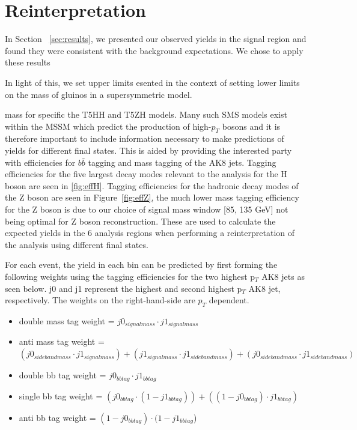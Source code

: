 \chapter{Reinterpretation}
\label{chap:reinterpretation}

In Section ~\ref{sec:results}, we presented our observed yields in the signal region and found they were consistent with the background expectations. We chose to apply these results


In light of this, we set upper limits esented in the context of setting lower limits on the mass of gluinos in a supersymmetric model. 

mass for specific the T5HH and T5ZH models. Many such SMS models exist within the MSSM which predict the production of high-$p_{T}$ bosons and it is therefore important to include information necessary to make predictions of yields for different final states. This is aided by providing the interested party with efficiencies for $b\bar{b}$ tagging and mass tagging of the AK8 jets. Tagging efficiencies for the five largest decay modes relevant to the analysis for the H boson are seen in \ref{fig:effH}. Tagging efficiencies for the hadronic decay modes of the Z boson are seen in Figure~\ref{fig:effZ}, the much lower mass tagging efficiency for the Z boson is due to our choice of signal mass window [85, 135 GeV] not being optimal for Z boson reconstruction. These are used to calculate the expected yields in the 6 analysis regions when performing a reinterpretation of the analysis using different final states. 

For each event, the yield in each bin can be predicted by first forming the following weights using the tagging efficiencies for the two highest p$_{T}$ AK8 jets as seen below. j0 and j1 represent the highest and second highest p$_{T}$ AK8 jet, respectively. The weights on the right-hand-side are $p_{T}$ dependent.

\begin{itemize}
\item double mass tag weight = $j0_{signalmass} \cdot j1_{signalmass}$
\item anti mass tag weight = $(j0_{sidebandmass} \cdot j1_{signalmass}) + (j1_{signalmass} \cdot j1_{sidebandmass}) + (j0_{sidebandmass} \cdot j1_{sidebandmass})$
\item double bb tag weight = $j0_{bbtag} \cdot j1_{bbtag}$
\item single bb tag weight = $(j0_{bbtag} \cdot (1-j1_{bbtag})) + ((1-j0_{bbtag})\cdot j1_{bbtag})$
\item anti bb tag weight = $(1-j0_{bbtag}) \cdot (1-j1_{bbtag}$)
\end{itemize}

